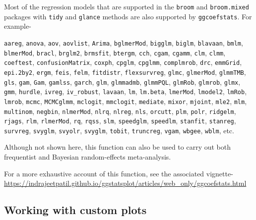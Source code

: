 \documentclass[
]{article}
\begin{document}
Most of the regression models that are supported in the \texttt{broom} and
\texttt{broom.mixed} packages with \texttt{tidy} and \texttt{glance} methods are also supported by
\texttt{ggcoefstats}. For example-

\texttt{aareg}, \texttt{anova}, \texttt{aov}, \texttt{aovlist}, \texttt{Arima}, \texttt{bglmerMod}, \texttt{bigglm}, \texttt{biglm},
\texttt{blavaan}, \texttt{bmlm}, \texttt{blmerMod}, \texttt{bracl}, \texttt{brglm2}, \texttt{brmsfit}, \texttt{btergm}, \texttt{cch},
\texttt{cgam}, \texttt{cgamm}, \texttt{clm}, \texttt{clmm}, \texttt{coeftest}, \texttt{confusionMatrix}, \texttt{coxph}, \texttt{cpglm},
\texttt{cpglmm}, \texttt{complmrob}, \texttt{drc}, \texttt{emmGrid}, \texttt{epi.2by2}, \texttt{ergm}, \texttt{feis}, \texttt{felm},
\texttt{fitdistr}, \texttt{flexsurvreg}, \texttt{glmc}, \texttt{glmerMod}, \texttt{glmmTMB}, \texttt{gls}, \texttt{gam}, \texttt{Gam},
\texttt{gamlss}, \texttt{garch}, \texttt{glm}, \texttt{glmmadmb}, \texttt{glmmPQL}, \texttt{glmRob}, \texttt{glmrob}, \texttt{glmx},
\texttt{gmm}, \texttt{hurdle}, \texttt{ivreg}, \texttt{iv\_robust}, \texttt{lavaan}, \texttt{lm}, \texttt{lm.beta}, \texttt{lmerMod},
\texttt{lmodel2}, \texttt{lmRob}, \texttt{lmrob}, \texttt{mcmc}, \texttt{MCMCglmm}, \texttt{mclogit}, \texttt{mmclogit},
\texttt{mediate}, \texttt{mixor}, \texttt{mjoint}, \texttt{mle2}, \texttt{mlm}, \texttt{multinom}, \texttt{negbin}, \texttt{nlmerMod},
\texttt{nlrq}, \texttt{nlreg}, \texttt{nls}, \texttt{orcutt}, \texttt{plm}, \texttt{polr}, \texttt{ridgelm}, \texttt{rjags}, \texttt{rlm},
\texttt{rlmerMod}, \texttt{rq}, \texttt{rqss}, \texttt{slm}, \texttt{speedglm}, \texttt{speedlm}, \texttt{stanfit}, \texttt{stanreg},
\texttt{survreg}, \texttt{svyglm}, \texttt{svyolr}, \texttt{svyglm}, \texttt{tobit}, \texttt{truncreg}, \texttt{vgam}, \texttt{wbgee},
\texttt{wblm}, etc.

Although not shown here, this function can also be used to carry out both
frequentist and Bayesian random-effects meta-analysis.

For a more exhaustive account of this function, see the associated vignette-
\url{https://indrajeetpatil.github.io/ggstatsplot/articles/web_only/ggcoefstats.html}

\hypertarget{working-with-custom-plots}{%
\subsection{Working with custom plots}\label{working-with-custom-plots}}
\end{document}
